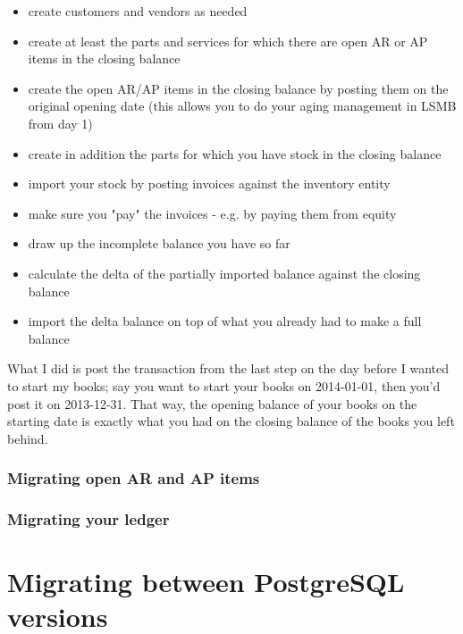 \begin{itemize}
\item create customers and vendors as needed
\item create at least the parts and services for which there are open AR or AP items in the closing balance
\item create the open AR/AP items in the closing balance by posting them on the original opening date (this allows you to do your aging management in LSMB from day 1)
\item create in addition the parts for which you have stock in the closing balance
\item import your stock by posting invoices against the inventory entity
\item make sure you "pay" the invoices - e.g. by paying them from equity
\item draw up the incomplete balance you have so far
\item calculate the delta of the partially imported balance against the closing balance
\item import the delta balance on top of what you already had to make a full balance
\end{itemize}


What I did is post the transaction from the last step on the day before I wanted to start my books; say you want to start your books on 2014-01-01, then you'd post it on 2013-12-31. That way, the opening balance of your books on the starting date is exactly what you had on the closing balance of the books you left behind.

\subsubsection{Migrating open AR and AP items}
\label{subsec-migration-others-open-items}

\subsubsection{Migrating your ledger}
\label{subsec-migration-others-ledger}

\section{Migrating between PostgreSQL versions}
\label{sec-migration-postrgesql}

